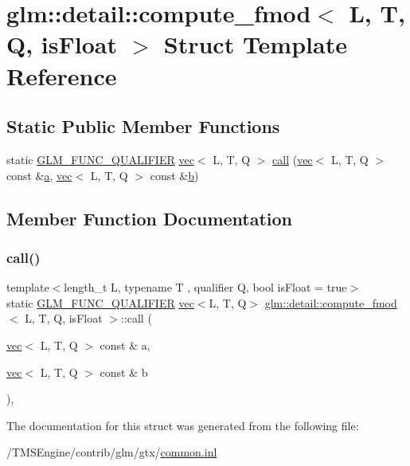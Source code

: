 \hypertarget{structglm_1_1detail_1_1compute__fmod}{}\section{glm\+:\+:detail\+:\+:compute\+\_\+fmod$<$ L, T, Q, is\+Float $>$ Struct Template Reference}
\label{structglm_1_1detail_1_1compute__fmod}
\subsection*{Static Public Member Functions}
\begin{DoxyCompactItemize}
\item 
static \hyperlink{setup_8hpp_a33fdea6f91c5f834105f7415e2a64407}{G\+L\+M\+\_\+\+F\+U\+N\+C\+\_\+\+Q\+U\+A\+L\+I\+F\+I\+ER} \hyperlink{structglm_1_1vec}{vec}$<$ L, T, Q $>$ \hyperlink{structglm_1_1detail_1_1compute__fmod_ae35d975da6d39feaf1e370b3bf0245cb}{call} (\hyperlink{structglm_1_1vec}{vec}$<$ L, T, Q $>$ const \&\hyperlink{_s_d_l__opengl__glext_8h_a3309789fc188587d666cda5ece79cf82}{a}, \hyperlink{structglm_1_1vec}{vec}$<$ L, T, Q $>$ const \&\hyperlink{_s_d_l__opengl__glext_8h_a0f71581a41fd2264c8944126dabbd010}{b})
\end{DoxyCompactItemize}


\subsection{Member Function Documentation}
\mbox{\label{structglm_1_1detail_1_1compute__fmod_ae35d975da6d39feaf1e370b3bf0245cb}} 
\subsubsection{\texorpdfstring{call()}{call()}}
{\footnotesize\ttfamily template$<$length\+\_\+t L, typename T , qualifier Q, bool is\+Float = true$>$ \\
static \hyperlink{setup_8hpp_a33fdea6f91c5f834105f7415e2a64407}{G\+L\+M\+\_\+\+F\+U\+N\+C\+\_\+\+Q\+U\+A\+L\+I\+F\+I\+ER} \hyperlink{structglm_1_1vec}{vec}$<$L, T, Q$>$ \hyperlink{structglm_1_1detail_1_1compute__fmod}{glm\+::detail\+::compute\+\_\+fmod}$<$ L, T, Q, is\+Float $>$\+::call (\begin{DoxyParamCaption}\item[{\hyperlink{structglm_1_1vec}{vec}$<$ L, T, Q $>$ const \&}]{a,  }\item[{\hyperlink{structglm_1_1vec}{vec}$<$ L, T, Q $>$ const \&}]{b }\end{DoxyParamCaption})\hspace{0.3cm}{\ttfamily [inline]}, {\ttfamily [static]}}



The documentation for this struct was generated from the following file\+:\begin{DoxyCompactItemize}
\item 
/\+T\+M\+S\+Engine/contrib/glm/gtx/\hyperlink{common_8inl}{common.\+inl}\end{DoxyCompactItemize}
